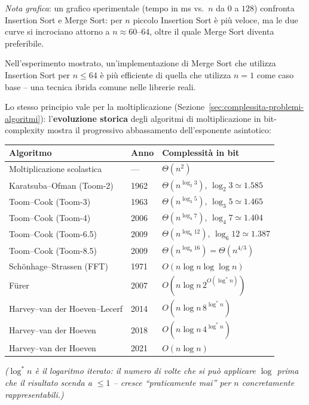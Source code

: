 \documentclass[12pt, a4paper]{article}
\begin{document}
\textit{Nota grafica}: un grafico sperimentale (tempo in ms vs.\ $n$ da $0$ a $128$) confronta Insertion Sort e Merge Sort: per $n$ piccolo Insertion Sort è più veloce, ma le due curve si incrociano attorno a $n\approx 60$--$64$, oltre il quale Merge Sort diventa preferibile.

\begin{tcolorbox}[colback=lightergray!5, colframe=tocsubsec, title=\textbf{Conseguenza Pratica}]
Nell'esperimento mostrato, un'implementazione di Merge Sort che utilizza Insertion Sort per $n \le 64$ è più efficiente di quella che utilizza $n=1$ come caso base -- una tecnica ibrida comune nelle librerie reali.
\end{tcolorbox}

Lo stesso principio vale per la moltiplicazione (Sezione~\ref{sec:complessita-problemi-algoritmi}): l'\textbf{evoluzione storica} degli algoritmi di moltiplicazione in bit-complexity mostra il progressivo abbassamento dell'esponente asintotico:

\begin{center}
\small
\begin{tabular}{lll}
\toprule
\textbf{Algoritmo} & \textbf{Anno} & \textbf{Complessità in bit} \\
\midrule
Moltiplicazione scolastica & --- & $\Theta(n^2)$ \\
Karatsuba--Ofman (Toom-2) & 1962 & $\Theta(n^{\log_2 3})$, $\log_2 3 \simeq 1.585$ \\
Toom--Cook (Toom-3) & 1963 & $\Theta(n^{\log_3 5})$, $\log_3 5 \simeq 1.465$ \\
Toom--Cook (Toom-4) & 2006 & $\Theta(n^{\log_4 7})$, $\log_4 7 \simeq 1.404$ \\
Toom--Cook (Toom-6.5) & 2009 & $\Theta(n^{\log_6 12})$, $\log_6 12 \simeq 1.387$ \\
Toom--Cook (Toom-8.5) & 2009 & $\Theta(n^{\log_8 16}) = \Theta(n^{4/3})$ \\
Schönhage--Strassen (FFT) & 1971 & $O(n\log n\log\log n)$ \\
Fürer & 2007 & $O(n\log n\, 2^{O(\log^* n)})$ \\
Harvey--van der Hoeven--Lecerf & 2014 & $O(n\log n\, 8^{\log^* n})$ \\
Harvey--van der Hoeven & 2018 & $O(n\log n\, 4^{\log^* n})$ \\
Harvey--van der Hoeven & 2021 & $O(n\log n)$ \\
\bottomrule
\end{tabular}
\end{center}
\textit{($\log^* n$ è il logaritmo iterato: il numero di volte che si può applicare $\log$ prima che il risultato scenda a $\le 1$ -- cresce ``praticamente mai'' per $n$ concretamente rappresentabili.)}
\end{document}
